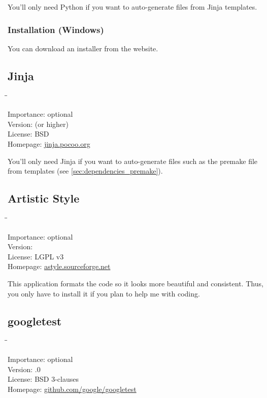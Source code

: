 You'll only need Python if you want to auto-generate files from Jinja
templates.

\subsubsection{Installation (Windows)}

You can download an installer from the website.

\subsection{Jinja}

\begin{tabbing}
  \hspace*{6em}\=\=\kill

  Importance:  \> optional \\
  Version:      (or higher) \\
  License:     \> BSD \\
  Homepage:    \> \href{http://jinja.pocoo.org/}{jinja.pocoo.org}
\end{tabbing}

You'll only need Jinja if you want to auto-generate files such as the
premake file from templates (see \ref{sec:dependencies_premake}).

\subsection{Artistic Style}

\begin{tabbing}
  \hspace*{6em}\=\=\kill

  Importance:  \> optional \\
  Version:      \\
  License:     \> LGPL v3 \\
  Homepage:    \> \href{http://astyle.sourceforge.net/}{astyle.sourceforge.net}
\end{tabbing}

This application formats the code so it looks more beautiful and
consistent.  Thus, you only have to install it if you plan to help me
with coding.

\subsection{googletest}

\begin{tabbing}
  \hspace*{6em}\=\=\kill

  Importance:  \> optional \\
  Version:     .0 \\
  License:     \> BSD 3-clauses \\
  Homepage:    \> \href{https://github.com/google/googletest}{github.com/google/googletest}
\end{tabbing}


